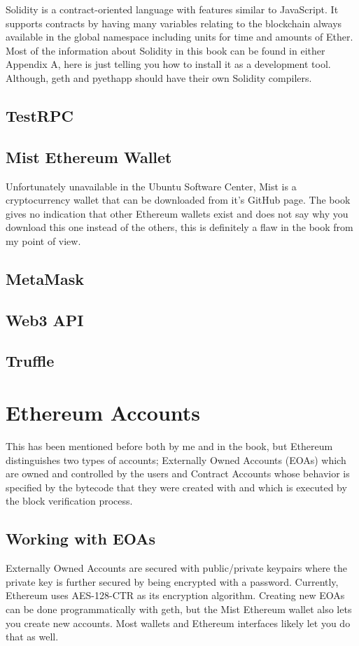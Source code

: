 \documentclass{article}
\begin{document}
Solidity is a contract-oriented language with features similar to JavaScript. It supports contracts by having many variables relating to the blockchain always available in the global namespace including units for time and amounts of Ether. Most of the information about Solidity in this book can be found in either Appendix A, here is just telling you how to install it as a development tool. Although, geth and pyethapp should have their own Solidity compilers.

\subsection{TestRPC}

\subsection{Mist Ethereum Wallet}
Unfortunately unavailable in the Ubuntu Software Center, Mist is a cryptocurrency wallet that can be downloaded from it's GitHub page. The book gives no indication that other Ethereum wallets exist and does not say why you download this one instead of the others, this is definitely a flaw in the book from my point of view.

\subsection{MetaMask}

\subsection{Web3 API}

\subsection{Truffle}

\section{Ethereum Accounts}
This has been mentioned before both by me and in the book, but Ethereum distinguishes two types of accounts; Externally Owned Accounts (EOAs) which are owned and controlled by the users and Contract Accounts whose behavior is specified by the bytecode that they were created with and which is executed by the block verification process.

\subsection{Working with EOAs}
Externally Owned Accounts are secured with public/private keypairs where the private key is further secured by being encrypted with a password. Currently, Ethereum uses AES-128-CTR as its encryption algorithm. Creating new EOAs can be done programmatically with geth, but the Mist Ethereum wallet also lets you create new accounts. Most wallets and Ethereum interfaces likely let you do that as well.
\end{document}
